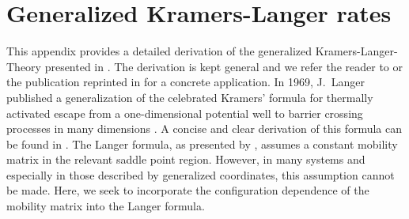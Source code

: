 \chapter{\label{app:genLanger}Generalized Kramers-Langer rates}
This appendix provides a detailed derivation of the generalized Kramers-Langer-Theory presented
in . The derivation is kept general and we refer the reader to  or the publication reprinted
in  for a concrete application. In 1969, J.~Langer published a generalization of the celebrated
Kramers' formula for thermally activated escape from a one-dimensional potential well to barrier 
crossing processes in many dimensions \cite{Langer_APNY_69}. 
A concise and clear derivation of this formula can be found in .
The Langer formula, as presented by \citeauthor{Haenggi_RevModPhys_90}\cite{Haenggi_RevModPhys_90}, assumes a constant
mobility matrix in the relevant saddle point region. However, in many systems and especially in those described by
generalized coordinates, this assumption cannot be made. 
Here, we seek to incorporate the configuration dependence of the mobility matrix into the Langer formula. 

